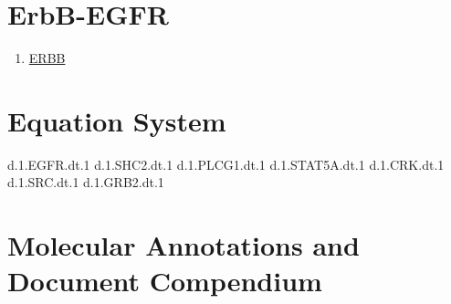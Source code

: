 
\section{ErbB-EGFR}

\begin{enumerate}
\item \href{https://www.genome.jp/kegg-bin/show_pathway?map=hsa04012&show_description=show}{ERBB}
\end{enumerate}

\section{Equation System}

d.1.EGFR.dt.1 
d.1.SHC2.dt.1 
d.1.PLCG1.dt.1 
d.1.STAT5A.dt.1 
d.1.CRK.dt.1 
d.1.SRC.dt.1 
d.1.GRB2.dt.1  


\section{Molecular Annotations and Document Compendium}


